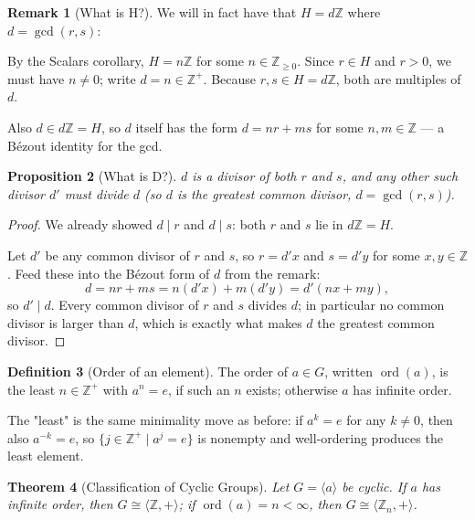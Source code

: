 \documentclass[11pt]{article}
\newcommand{\1}{\mathbf{1}}
\theoremstyle{notestyle}
\newtheorem{theorem}{Theorem}[section]
\newtheorem{proposition}[theorem]{Proposition}
\theoremstyle{definition}
\newtheorem{definition}[theorem]{Definition}
\newtheorem{remark}[theorem]{Remark}
\begin{document}
\begin{remark}[What is H?]
\label{rem:label}
We will in fact have that $H = d\mathbb{Z}$ where $d = \gcd(r, s)$:
\par By the Scalars corollary, $H = n\mathbb{Z}$ for some $n \in \mathbb{Z}_{\ge 0}$.
Since $r \in H$ and $r > 0$, we must have $n \ne 0$; write $d = n \in
\mathbb{Z}^{+}$. Because $r, s \in H = d\mathbb{Z}$, both are multiples of $d$.
\par Also $d \in d\mathbb{Z} = H$, so $d$ itself has the form $d = nr + ms$ for some
$n, m \in \mathbb{Z}$ — a Bézout identity for the gcd.
\end{remark}
\begin{proposition}[What is D?]
\label{prop:label}
$d$ is a divisor of both $r$ and $s$, and any other such divisor $d'$ must divide
$d$ (so $d$ is the greatest common divisor, $d = \gcd(r, s)$).
\end{proposition}
\begin{proof}
We already showed $d \mid r$ and $d \mid s$: both $r$ and $s$ lie in $d\mathbb{Z} = H$.
\par Let $d'$ be any common divisor of $r$ and $s$, so $r = d'x$ and $s = d'y$ for
some $x, y \in \mathbb{Z}$. Feed these into the Bézout form of $d$ from the remark:
$$d = nr + ms = n(d'x) + m(d'y) = d'(nx + my),$$
so $d' \mid d$. Every common divisor of $r$ and $s$ divides $d$; in particular no
common divisor is larger than $d$, which is exactly what makes $d$ the greatest
common divisor.
\end{proof}
\begin{definition}[Order of an element]
\label{def:element-order}
The order of $a \in G$, written $\operatorname{ord}(a)$, is the least
$n \in \mathbb{Z}^{+}$ with $a^{n} = e$, if such an $n$ exists; otherwise $a$ has
infinite order.
\par The "least" is the same minimality move as before: if $a^{k} = e$ for any
$k \ne 0$, then also $a^{-k} = e$, so $\{j \in \mathbb{Z}^{+} \mid a^{j} = e\}$ is
nonempty and well-ordering produces the least element.
\end{definition}
\begin{theorem}[Classification of Cyclic Groups]
\label{thm:classification}
Let $G = \langle a \rangle$ be cyclic. If $a$ has infinite order, then
$G \cong \langle \mathbb{Z}, + \rangle$; if $\operatorname{ord}(a) = n < \infty$,
then $G \cong \langle \mathbb{Z}_n, + \rangle$.
\end{theorem}
\end{document}
